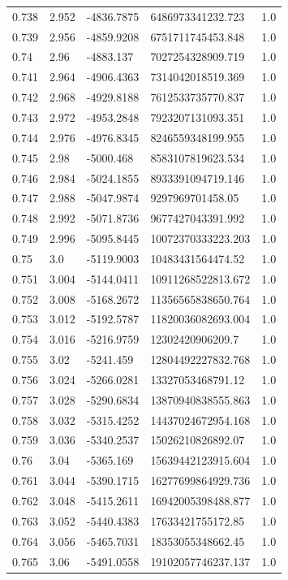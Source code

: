 \begin{tabular}{lllll}
0.738 & 2.952 & -4836.7875 & 6486973341232.723 & 1.0 \\
0.739 & 2.956 & -4859.9208 & 6751711745453.848 & 1.0 \\
0.74 & 2.96 & -4883.137 & 7027254328909.719 & 1.0 \\
0.741 & 2.964 & -4906.4363 & 7314042018519.369 & 1.0 \\
0.742 & 2.968 & -4929.8188 & 7612533735770.837 & 1.0 \\
0.743 & 2.972 & -4953.2848 & 7923207131093.351 & 1.0 \\
0.744 & 2.976 & -4976.8345 & 8246559348199.955 & 1.0 \\
0.745 & 2.98 & -5000.468 & 8583107819623.534 & 1.0 \\
0.746 & 2.984 & -5024.1855 & 8933391094719.146 & 1.0 \\
0.747 & 2.988 & -5047.9874 & 9297969701458.05 & 1.0 \\
0.748 & 2.992 & -5071.8736 & 9677427043391.992 & 1.0 \\
0.749 & 2.996 & -5095.8445 & 10072370333223.203 & 1.0 \\
0.75 & 3.0 & -5119.9003 & 10483431564474.52 & 1.0 \\
0.751 & 3.004 & -5144.0411 & 10911268522813.672 & 1.0 \\
0.752 & 3.008 & -5168.2672 & 11356565838650.764 & 1.0 \\
0.753 & 3.012 & -5192.5787 & 11820036082693.004 & 1.0 \\
0.754 & 3.016 & -5216.9759 & 12302420906209.7 & 1.0 \\
0.755 & 3.02 & -5241.459 & 12804492227832.768 & 1.0 \\
0.756 & 3.024 & -5266.0281 & 13327053468791.12 & 1.0 \\
0.757 & 3.028 & -5290.6834 & 13870940838555.863 & 1.0 \\
0.758 & 3.032 & -5315.4252 & 14437024672954.168 & 1.0 \\
0.759 & 3.036 & -5340.2537 & 15026210826892.07 & 1.0 \\
0.76 & 3.04 & -5365.169 & 15639442123915.604 & 1.0 \\
0.761 & 3.044 & -5390.1715 & 16277699864929.736 & 1.0 \\
0.762 & 3.048 & -5415.2611 & 16942005398488.877 & 1.0 \\
0.763 & 3.052 & -5440.4383 & 17633421755172.85 & 1.0 \\
0.764 & 3.056 & -5465.7031 & 18353055348662.45 & 1.0 \\
0.765 & 3.06 & -5491.0558 & 19102057746237.137 & 1.0 \\

\end{tabular}
